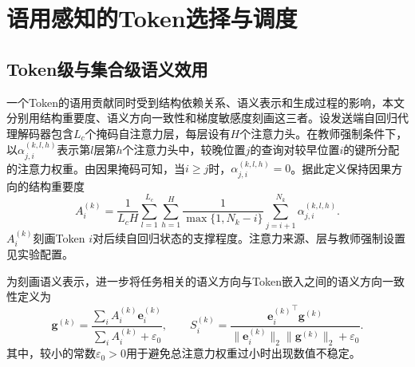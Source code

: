 \documentclass[journal]{IEEEtran}
\begin{document}
\section{语用感知的Token选择与调度}
\label{sec:utility}

\subsection{Token级与集合级语义效用}

一个Token的语用贡献同时受到结构依赖关系、语义表示和生成过程的影响，本文分别用结构重要度、语义方向一致性和梯度敏感度刻画这三者。设发送端自回归代理解码器包含$L_c$个掩码自注意力层，每层设有$H$个注意力头。在教师强制条件下，以$\alpha_{j,i}^{(k,l,h)}$表示第$l$层第$h$个注意力头中，较晚位置$j$的查询对较早位置$i$的键所分配的注意力权重。由因果掩码可知，当$i\geq j$时，$\alpha_{j,i}^{(k,l,h)}=0$。据此定义保持因果方向的结构重要度
\begin{equation}
A_i^{(k)}
=\frac{1}{L_cH}\sum_{l=1}^{L_c}\sum_{h=1}^{H}
\frac{1}{\max\{1,N_k-i\}}
\sum_{j=i+1}^{N_k}\alpha_{j,i}^{(k,l,h)}.
\label{eq:attn}
\end{equation}
$A_i^{(k)}$刻画Token $i$对后续自回归状态的支撑程度。注意力来源、层与教师强制设置见实验配置。

为刻画语义表示，进一步将任务相关的语义方向与Token嵌入之间的语义方向一致性定义为
\begin{equation}
\bm g^{(k)}
=\frac{\sum_iA_i^{(k)}\bm e_i^{(k)}}{\sum_iA_i^{(k)}+\varepsilon_0},
\qquad
S_i^{(k)}
=\frac{{\bm e_i^{(k)}}^{\!\top}\bm g^{(k)}}
{\|\bm e_i^{(k)}\|_2\|\bm g^{(k)}\|_2+\varepsilon_0}.
\label{eq:semantic_consistency}
\end{equation}
其中，较小的常数$\varepsilon_0>0$用于避免总注意力权重过小时出现数值不稳定。
\end{document}
